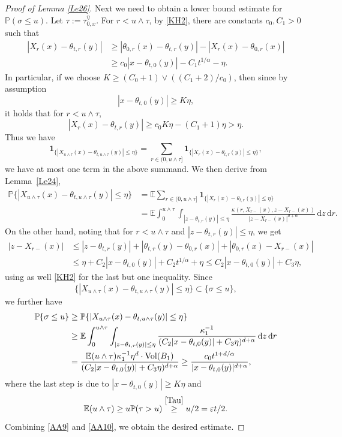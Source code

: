 \documentclass[JEP,XML,SOM,Unicode,published]{cedram}
\theoremstyle{plain}
\theoremstyle{definition}
\let\eps\varepsilon
\newcommand\mE{\mathbb{E}}
\newcommand\mP{\mathbb{P}}
\newcommand\1{{\mathbf{1}}}
\newcommand{\dif}{\,\mathrm{d}}
\begin{document}
\begin{proof}[Proof of Lemma \ref{Le26}]
Next we need to obtain a lower bound estimate for $\mP(\sigma\leq u)$. Let $\tau:=\tau^\eta_{0,x}$.
For $r<u\wedge\tau$, by \eqref{KH2},
there are constants $c_0, C_1>0$ such that
\begin{align*}
|X_{r}(x)-\theta_{t,r}(y)|&\geq|\theta_{0,r}(x)-\theta_{t,r}(y)|-|X_{r}(x)-\theta_{0,r}(x)|
\\&\geq c_0|x-\theta_{t,0}(y)|-C_1 t^{1/\alpha}-\eta.
\end{align*}
In particular, if we choose $K\geq (C_0+1)\vee ((C_1+2)/c_0)$, then since by assumption
\[
|x-\theta_{t,0}(y)|\geq K\eta,
\]
it holds that for $r<u\wedge\tau$,
\begin{equation*}
|X_{r}(x)-\theta_{t,r}(y)|\geq c_0K\eta-(C_1+1)\eta>\eta.\label{DG2}
\end{equation*}
Thus we have
\[
\1_{\{|X_{u\wedge\tau}(x)-\theta_{t,u\wedge\tau}(y)|\leq\eta\}}
=\sum_{r\in(0,u\wedge\tau]}\1_{\{|X_r(x)-\theta_{t,r}(y)|\leq\eta\}},
\]
\ie we have at most one term in the above summand. We then derive from Lemma~\ref{Le24},
\begin{align*}
\mP{\{|X_{u\wedge\tau}(x)-\theta_{t,u\wedge\tau}(y)|\leq\eta\}}
&=\mE\sum_{r\in(0,u\wedge\tau]}\1_{\{|X_r(x)-\theta_{t,r}(y)|\leq\eta\}}\\
&=\mE\int^{u\wedge\tau}_0\!\!\!\int_{|z-\theta_{t,r}(y)|\leq\eta}\frac{\kappa(r, X_{r-}(x), z-X_{r-}(x))}{|z-X_{r-}(x)|^{d+\alpha}}\dif z\dif r.
\end{align*}
On the other hand, noting that for $r<u\wedge\tau$ and $|z-\theta_{t,r}(y)|\leq\eta$, we get
\begin{align*}
|z-X_{r-}(x)|&\leq|z-\theta_{t,r}(y)|+|\theta_{t,r}(y)-\theta_{0,r}(x)|+|\theta_{0,r}(x)-X_{r-}(x)|
\\&\leq \eta+C_2|x-\theta_{t,0}(y)|+C_2 t^{1/\alpha}+\eta\leq C_2|x-\theta_{t,0}(y)|+C_3\eta,
\end{align*}
using as well \eqref{KH2} for the last but one inequality. Since
\[
\{|X_{u\wedge\tau}(x)-\theta_{t,u\wedge\tau}(y)|\leq\eta\}\subset \{\sigma\leq u\},
\]
we further have
\begin{equation}
\begin{aligned}
\mP\{\sigma\leq u\}&\geq \mP{\{|X_{u\wedge\tau}(x)-\theta_{t,u\wedge\tau}(y)|\leq\eta\}}\\
&\geq\mE\int^{u\wedge\tau}_0\int_{|z-\theta_{t,r}(y)|\leq\eta}\frac{\kappa_1^{-1}}
{(C_2|x-\theta_{t,0}(y)|+C_3\eta)^{d+\alpha}}\dif z\dif r
\\&=\frac{\mE(u\wedge\tau)\kappa_1^{-1}\eta^d\cdot {\rm Vol}(B_1)}{(C_2|x-\theta_{t,0}(y)|+C_3\eta)^{d+\alpha}}
\geq\frac{c_0 t^{1+d/\alpha}}{|x-\theta_{t,0}(y)|^{d+\alpha}},\label{AA10}
\end{aligned}
\end{equation}
where the last step is due to $|x-\theta_{t,0}(y)|\geq K\eta$ and
\[
\mE (u\wedge\tau)\geq u\mP(\tau>u)\stackrel{\eqref{Tau}}{\geq} u/2=\eps t/2.
\]
Combining \eqref{AA9} and \eqref{AA10}, we obtain the desired estimate.
\end{proof}
\end{document}
